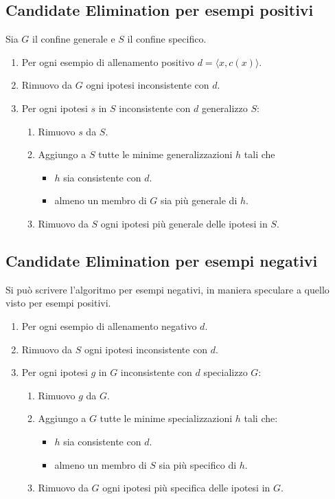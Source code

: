 \subsection{Candidate Elimination per esempi positivi}
Sia $G$ il confine generale e $S$ il confine specifico.
\begin{enumerate}
	\item Per ogni esempio di allenamento positivo $d = \langle x, c(x) \rangle$.
	\item Rimuovo da $G$ ogni ipotesi inconsistente con $d$.
	\item Per ogni ipotesi $s$ in $S$ inconsistente con $d$ generalizzo $S$:
	      \begin{enumerate}
		      \item Rimuovo $s$ da $S$.
		      \item Aggiungo a $S$ tutte le minime generalizzazioni $h$ tali che
		            \begin{itemize}
			            \item $h$ sia consistente con $d$.
			            \item almeno un membro di $G$ sia pi\`u generale di $h$.
		            \end{itemize}
		      \item Rimuovo da $S$ ogni ipotesi pi\`u generale delle ipotesi in $S$.
	      \end{enumerate}
\end{enumerate}

\subsection{Candidate Elimination per esempi negativi}
Si pu\`o scrivere l'algoritmo per esempi negativi, in maniera speculare a quello visto per esempi positivi.
\begin{enumerate}
	\item Per ogni esempio di allenamento negativo $d$.
	\item Rimuovo da $S$ ogni ipotesi inconsistente con $d$.
	\item Per ogni ipotesi $g$ in $G$ inconsistente con $d$ specializzo $G$:
	      \begin{enumerate}
		      \item Rimuovo $g$ da $G$.
		      \item Aggiungo a $G$ tutte le minime specializzazioni $h$ tali che:
		            \begin{itemize}
			            \item $h$ sia consistente con $d$.
			            \item almeno un membro di $S$ sia pi\`u specifico di $h$.
		            \end{itemize}
		      \item Rimuovo da $G$ ogni ipotesi pi\`u specifica delle ipotesi in $G$.
	      \end{enumerate}
\end{enumerate}

